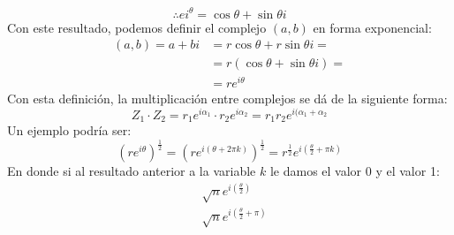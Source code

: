 \documentclass[12pt, twocolumn]{article}
\begin{document}
$$\therefore ei^{\theta}=\cos{\theta}+\sin{\theta}i$$
Con este resultado, podemos definir el complejo $(a,b)$ en forma exponencial:
\begin{equation*}
    \begin{aligned}
        (a,b)=a+bi &=r\cos{\theta}+r\sin{\theta}i=\\
                   &=r(\cos{\theta}+\sin{\theta}i)=\\
                   &=\boxed{re^{i\theta}}
    \end{aligned}
\end{equation*}
Con esta definición, la multiplicación entre complejos se dá de la siguiente forma:
$$Z_1\cdot Z_2=r_1 e^{i \alpha_1}\cdot r_2 e^{i \alpha_2}=r_1 r_2 e^{i(\alpha_1+\alpha_2}$$
Un ejemplo podría ser:
$$(r e^{i\theta})^{\frac{1}{2}}=(r e^{i(\theta+2\pi k)})^{\frac{1}{2}}=r^{\frac{1}{2}}e^{i(\frac{\theta}{2}+\pi k)}$$
En donde si al resultado anterior a la variable $k$ le damos el valor 0 y el valor 1:
\begin{equation*}
    \begin{aligned}
        &\sqrt{n}e^{i(\frac{\theta}{2})}\\
        &\sqrt{n}e^{i(\frac{\theta}{2}+\pi)}
    \end{aligned}
\end{equation*}
\end{document}
